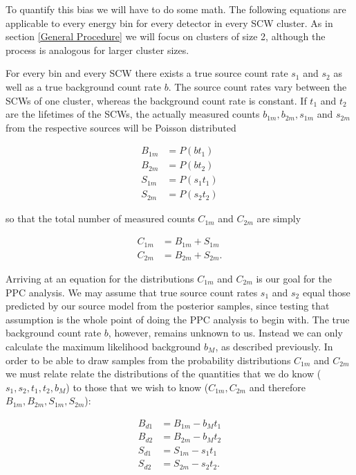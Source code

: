 \documentclass{report}
\begin{document}
To quantify this bias we will have to do some math. The following equations are applicable to every energy bin for every detector in every SCW cluster. As in section \ref{General Procedure} we will focus on clusters of size 2, although the process is analogous for larger cluster sizes.

For every bin and every SCW there exists a true source count rate $s_1$ and $s_2$ as well as a true background count rate $b$. The source count rates vary between the SCWs of one cluster, whereas the background count rate is constant. If $t_1$ and $t_2$ are the lifetimes of the SCWs, the actually measured counts $b_{1m}, b_{2m}, s_{1m}$ and $s_{2m}$ from the respective sources will be Poisson distributed

\begin{align*}
    B_{1m} &= P(bt_1) \\
    B_{2m} &= P(bt_2) \\
    S_{1m} &= P(s_1t_1) \\
    S_{2m} &= P(s_2t_2)
\end{align*}

so that the total number of measured counts $C_{1m}$ and $C_{2m}$ are simply

\begin{align*}
    C_{1m} &= B_{1m} + S_{1m} \\
    C_{2m} &= B_{2m} + S_{2m}.
\end{align*}

Arriving at an equation for the distributions $C_{1m}$ and $C_{2m}$ is our goal for the PPC analysis. We may assume that true source count rates $s_1$ and $s_2$ equal those predicted by our source model from the posterior samples, since testing that assumption is the whole point of doing the PPC analysis to begin with. The true background count rate $b$, however, remains unknown to us. Instead we can only calculate the maximum likelihood background $b_M$, as described previously. In order to be able to draw samples from the probability distributions $C_{1m}$ and $C_{2m}$ we must relate relate the distributions of the quantities that we do know ($s_1, s_2, t_1, t_2, b_M$) to those that we wish to know ($C_{1m}, C_{2m}$ and therefore $B_{1m}, B_{2m}, S_{1m}, S_{2m}$):

\begin{align*}
    B_{d1} &= B_{1m} - b_Mt_1 \\
    B_{d2} &= B_{2m} - b_Mt_2 \\
    S_{d1} &= S_{1m} - s_1t_1 \\
    S_{d2} &= S_{2m} - s_2t_2.
\end{align*}
\end{document}
